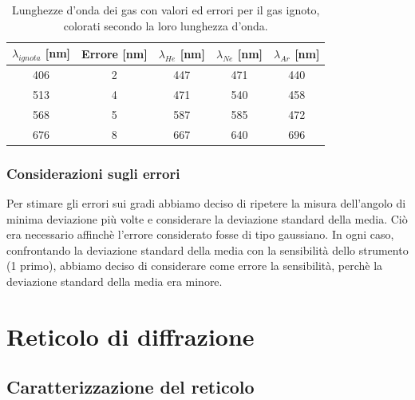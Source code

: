 \documentclass[letterpaper,12pt]{article}
\begin{document}
\begin{table}[h!]
    \centering
    \begin{tabular}{|c|c|c|c|c|}
    \hline
    \textbf{$\lambda_{ignota}$} [nm] & \textbf{Errore} [nm] & \textbf{$\lambda_{He}$} [nm] & \textbf{$\lambda_{Ne}$} [nm] & \textbf{$\lambda_{Ar}$} [nm]\\
    \hline
    \cellcolor{wavelength_406} 406 & \cellcolor{wavelength_nan}2 & \cellcolor{wavelength_447} 447 & \cellcolor{wavelength_471} 471 & \cellcolor{wavelength_440} 440 \\
    \hline
    \cellcolor{wavelength_513} 513 & \cellcolor{wavelength_nan}4 & \cellcolor{wavelength_471} 471 & \cellcolor{wavelength_540} 540 & \cellcolor{wavelength_458} 458 \\
    \hline
    \cellcolor{wavelength_568} 568 & \cellcolor{wavelength_nan}5 & \cellcolor{wavelength_587} 587 & \cellcolor{wavelength_585} 585 & \cellcolor{wavelength_472} 472 \\
    \hline
    \cellcolor{wavelength_676} 676 & \cellcolor{wavelength_nan}8 & \cellcolor{wavelength_667} 667 & \cellcolor{wavelength_640} 640 & \cellcolor{wavelength_696} 696 \\
    \hline
    \end{tabular}
    \caption{Lunghezze d'onda dei gas con valori ed errori per il gas ignoto, colorati secondo la loro lunghezza d'onda.}
    \label{tab:prisma_ignoto}
\end{table}

\subsubsection{Considerazioni sugli errori}
Per stimare gli errori sui gradi abbiamo deciso di ripetere la misura dell'angolo di minima deviazione più volte e 
considerare la deviazione standard della media. Ciò era necessario affinchè l'errore considerato fosse di tipo gaussiano. 
In ogni caso, confrontando la deviazione standard della media con la sensibilità dello strumento (1 primo), 
abbiamo deciso di considerare come errore la sensibilità, perchè la deviazione standard della media era minore.



\section{Reticolo di diffrazione}

\subsection{Caratterizzazione del reticolo}
\end{document}
